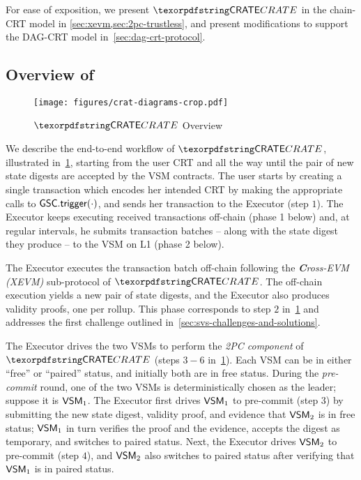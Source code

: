 For ease of exposition, we present $\pname$ in the chain-CRT model in \cref{sec:xevm,sec:2pc-trustless}, and present modifications to support the DAG-CRT model in~\cref{sec:dag-crt-protocol}.





\subsection{Overview of \pname}






\begin{figure}
    \centering
    \texttt{[image: figures/crat-diagrams-crop.pdf]}
    \caption{$\pname$ Overview}
    \label{fig:protocol-diagram}
\end{figure}

We describe the end-to-end workflow of $\pname$, illustrated in~\cref{fig:protocol-diagram}, starting from the user CRT and all the way until the pair of new state digests are accepted by the VSM contracts. The user starts by creating a single transaction which encodes her intended CRT by making the appropriate calls to $\mathsf{GSC}.\mathsf{trigger}(\cdot)$, and sends her transaction to the Executor (step $1$). The Executor keeps executing received transactions off-chain (phase 1 below) and, at regular intervals, he submits transaction batches -- along with the state digest they produce -- to the VSM on L1 (phase 2 below).

 The Executor executes the transaction batch off-chain following the \emph{\textbf{C}ross-EVM (XEVM)} sub-protocol of $\pname$. The off-chain execution yields a new pair of state digests, and the Executor also produces validity proofs, one per rollup. This phase corresponds to step $2$ in~\cref{fig:protocol-diagram} and addresses the first challenge outlined in~\cref{sec:svs-challenges-and-solutions}. 

 The Executor drives the two VSMs to perform the \emph{2PC component} of $\pname$ (steps $3-6$ in~\cref{fig:protocol-diagram}). Each VSM can be in either ``free'' or ``paired'' status, and initially both are in free status.
During the \textit{pre-commit} round, one of the two VSMs is deterministically chosen as the leader; suppose it is $\mathsf{VSM}_{1}$. The Executor first drives $\mathsf{VSM}_{1}$ to pre-commit (step $3$) by submitting the new state digest, validity proof, and evidence that $\mathsf{VSM}_{2}$ is in free status; 
$\mathsf{VSM}_{1}$ in turn verifies the proof and the evidence, accepts the digest as temporary, and switches to paired status.
Next, the Executor drives $\mathsf{VSM}_{2}$ to pre-commit (step $4$), and $\mathsf{VSM}_{2}$ also switches to paired status after verifying that $\mathsf{VSM}_{1}$ is in paired status.

